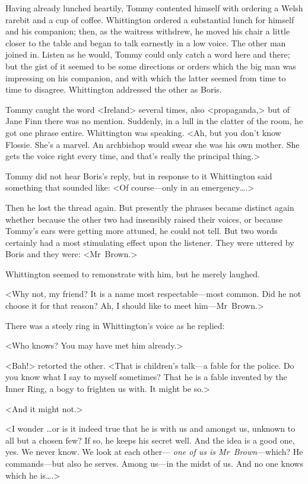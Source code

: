 Having already lunched heartily, Tommy contented himself with ordering a Welsh rarebit and a cup of coffee. Whittington ordered a substantial lunch for himself and his companion; then, as the waitress withdrew, he moved his chair a little closer to the table and began to talk earnestly in a low voice. The other man joined in. Listen as he would, Tommy could only catch a word here and there; but the gist of it seemed to be some directions or orders which the big man was impressing on his companion, and with which the latter seemed from time to time to disagree. Whittington addressed the other as Boris.

Tommy caught the word <Ireland> several times, also <propaganda,> but of Jane Finn there was no mention. Suddenly, in a lull in the clatter of the room, he got one phrase entire. Whittington was speaking. <Ah, but you don't know Flossie. She's a marvel. An archbishop would swear she was his own mother. She gets the voice right every time, and that's really the principal thing.>

Tommy did not hear Boris's reply, but in response to it Whittington said something that sounded like: <Of course—only in an emergency\dots.>

Then he lost the thread again. But presently the phrases became distinct again whether because the other two had insensibly raised their voices, or because Tommy's ears were getting more attuned, he could not tell. But two words certainly had a most stimulating effect upon the listener. They were uttered by Boris and they were: <Mr~Brown.>

Whittington seemed to remonstrate with him, but he merely laughed.

<Why not, my friend? It is a name most respectable—most common. Did he not choose it for that reason? Ah, I should like to meet him—Mr~Brown.>

There was a steely ring in Whittington's voice as he replied:

<Who knows? You may have met him already.>

<Bah!> retorted the other. <That is children's talk—a fable for the police. Do you know what I say to myself sometimes? That he is a fable invented by the Inner Ring, a bogy to frighten us with. It might be so.>

<And it might not.>

<I wonder \dots or is it indeed true that he is with us and amongst us, unknown to all but a chosen few? If so, he keeps his secret well. And the idea is a good one, yes. We never know. We look at each other— \emph{one of us is Mr~Brown}—which? He commands—but also he serves. Among us—in the midst of us. And no one knows which he is\dots.>

